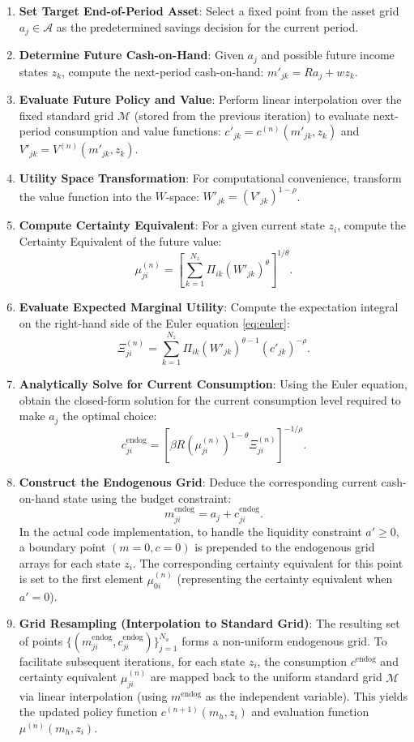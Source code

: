 \documentclass[a4paper,12pt]{article}
\newcommand{\R}{R}
\newcommand{\Agrid}{\mathcal{A}}
\newcommand{\Mgrid}{\mathcal{M}}
\begin{document}
\begin{enumerate}
    \item \textbf{Set Target End-of-Period Asset}: Select a fixed point from the asset grid $a_j\in\Agrid$ as the predetermined savings decision for the current period.
    \item \textbf{Determine Future Cash-on-Hand}: Given $a_j$ and possible future income states $z_k$, compute the next-period cash-on-hand: $m'_{jk}=\R a_j+wz_k$.
    \item \textbf{Evaluate Future Policy and Value}: Perform linear interpolation over the fixed standard grid $\Mgrid$ (stored from the previous iteration) to evaluate next-period consumption and value functions: $c'_{jk}=c^{(n)}(m'_{jk},z_k)$ and $V'_{jk}=V^{(n)}(m'_{jk},z_k)$.
    \item \textbf{Utility Space Transformation}: For computational convenience, transform the value function into the $W$-space: $W'_{jk}=(V'_{jk})^{1-\rho}$.
    \item \textbf{Compute Certainty Equivalent}: For a given current state $z_i$, compute the Certainty Equivalent of the future value:
    \[
        \mu^{(n)}_{ji} = \left[ \sum_{k=1}^{N_z} \Pi_{ik}(W'_{jk})^\theta \right]^{1/\theta}.
    \]
    \item \textbf{Evaluate Expected Marginal Utility}: Compute the expectation integral on the right-hand side of the Euler equation \eqref{eq:euler}:
    \[
        \Xi^{(n)}_{ji} = \sum_{k=1}^{N_z} \Pi_{ik} (W'_{jk})^{\theta-1} (c'_{jk})^{-\rho}.
    \]
    \item \textbf{Analytically Solve for Current Consumption}: Using the Euler equation, obtain the closed-form solution for the current consumption level required to make $a_j$ the optimal choice:
    \[
        c^{\mathrm{endog}}_{ji} = \left[ \beta\R \left(\mu^{(n)}_{ji}\right)^{1-\theta} \Xi^{(n)}_{ji} \right]^{-1/\rho}.
    \]
    \item \textbf{Construct the Endogenous Grid}: Deduce the corresponding current cash-on-hand state using the budget constraint:
    \[
        m^{\mathrm{endog}}_{ji} = a_j+c^{\mathrm{endog}}_{ji}.
    \]
    In the actual code implementation, to handle the liquidity constraint $a' \ge 0$, a boundary point $(m=0, c=0)$ is prepended to the endogenous grid arrays for each state $z_i$. The corresponding certainty equivalent for this point is set to the first element $\mu^{(n)}_{0i}$ (representing the certainty equivalent when $a'=0$).
    \item \textbf{Grid Resampling (Interpolation to Standard Grid)}: The resulting set of points $\{(m^{\mathrm{endog}}_{ji},c^{\mathrm{endog}}_{ji})\}_{j=1}^{N_a}$ forms a non-uniform endogenous grid. To facilitate subsequent iterations, for each state $z_i$, the consumption $c^{\mathrm{endog}}$ and certainty equivalent $\mu^{(n)}_{ji}$ are mapped back to the uniform standard grid $\Mgrid$ via linear interpolation (using $m^{\mathrm{endog}}$ as the independent variable). This yields the updated policy function $c^{(n+1)}(m_h,z_i)$ and evaluation function $\mu^{(n)}(m_h,z_i)$.

\end{enumerate}
\end{document}
